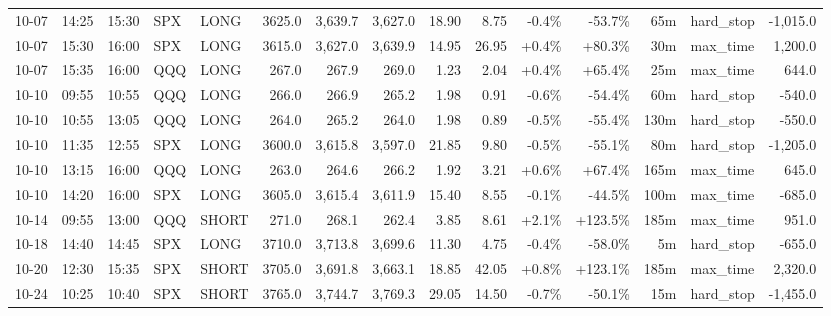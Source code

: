 \documentclass[11pt,a4paper,twoside]{article}
\begin{document}
\begin{landscape}
\begin{center}
\begin{longtable}{>{\color{txtmain}}l l l l l r r r r r r r r >{\color{txtmain}}l r}
10-07 & 14:25 & 15:30 & SPX & LONG & 3625.0 & 3,639.7 & 3,627.0 & 18.90 & 8.75 & \textcolor{lossred}{-0.4\%} & \textcolor{lossred}{-53.7\%} & 65m & hard\_stop & \textcolor{lossred}{-1,015.0} \\
10-07 & 15:30 & 16:00 & SPX & LONG & 3615.0 & 3,627.0 & 3,639.9 & 14.95 & 26.95 & \textcolor{wingreen}{+0.4\%} & \textcolor{wingreen}{+80.3\%} & 30m & max\_time & \textcolor{wingreen}{1,200.0} \\
10-07 & 15:35 & 16:00 & QQQ & LONG & 267.0 & 267.9 & 269.0 & 1.23 & 2.04 & \textcolor{wingreen}{+0.4\%} & \textcolor{wingreen}{+65.4\%} & 25m & max\_time & \textcolor{wingreen}{644.0} \\
10-10 & 09:55 & 10:55 & QQQ & LONG & 266.0 & 266.9 & 265.2 & 1.98 & 0.91 & \textcolor{lossred}{-0.6\%} & \textcolor{lossred}{-54.4\%} & 60m & hard\_stop & \textcolor{lossred}{-540.0} \\
10-10 & 10:55 & 13:05 & QQQ & LONG & 264.0 & 265.2 & 264.0 & 1.98 & 0.89 & \textcolor{lossred}{-0.5\%} & \textcolor{lossred}{-55.4\%} & 130m & hard\_stop & \textcolor{lossred}{-550.0} \\
10-10 & 11:35 & 12:55 & SPX & LONG & 3600.0 & 3,615.8 & 3,597.0 & 21.85 & 9.80 & \textcolor{lossred}{-0.5\%} & \textcolor{lossred}{-55.1\%} & 80m & hard\_stop & \textcolor{lossred}{-1,205.0} \\
10-10 & 13:15 & 16:00 & QQQ & LONG & 263.0 & 264.6 & 266.2 & 1.92 & 3.21 & \textcolor{wingreen}{+0.6\%} & \textcolor{wingreen}{+67.4\%} & 165m & max\_time & \textcolor{wingreen}{645.0} \\
10-10 & 14:20 & 16:00 & SPX & LONG & 3605.0 & 3,615.4 & 3,611.9 & 15.40 & 8.55 & \textcolor{lossred}{-0.1\%} & \textcolor{lossred}{-44.5\%} & 100m & max\_time & \textcolor{lossred}{-685.0} \\
10-14 & 09:55 & 13:00 & QQQ & SHORT & 271.0 & 268.1 & 262.4 & 3.85 & 8.61 & \textcolor{wingreen}{+2.1\%} & \textcolor{wingreen}{+123.5\%} & 185m & max\_time & \textcolor{wingreen}{951.0} \\
10-18 & 14:40 & 14:45 & SPX & LONG & 3710.0 & 3,713.8 & 3,699.6 & 11.30 & 4.75 & \textcolor{lossred}{-0.4\%} & \textcolor{lossred}{-58.0\%} & 5m & hard\_stop & \textcolor{lossred}{-655.0} \\
10-20 & 12:30 & 15:35 & SPX & SHORT & 3705.0 & 3,691.8 & 3,663.1 & 18.85 & 42.05 & \textcolor{wingreen}{+0.8\%} & \textcolor{wingreen}{+123.1\%} & 185m & max\_time & \textcolor{wingreen}{2,320.0} \\
10-24 & 10:25 & 10:40 & SPX & SHORT & 3765.0 & 3,744.7 & 3,769.3 & 29.05 & 14.50 & \textcolor{lossred}{-0.7\%} & \textcolor{lossred}{-50.1\%} & 15m & hard\_stop & \textcolor{lossred}{-1,455.0} \\

\end{longtable}
\end{center}
\end{landscape}
\end{document}
